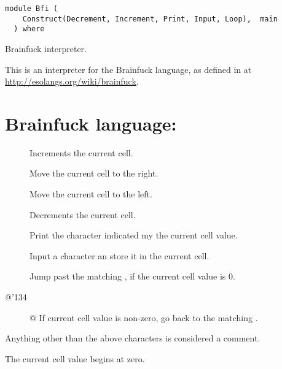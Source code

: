 \label{module:Bfi}
\haddockbeginheader
{\haddockverb\begin{verbatim}
module Bfi (
    Construct(Decrement, Increment, Print, Input, Loop),  main
  ) where\end{verbatim}}
\haddockendheader

Brainfuck interpreter.\par
This is an interpreter for the Brainfuck language, as defined in at
\url{http://esolangs.org/wiki/brainfuck}.\par
\section*{Brainfuck language:}\begin{description}
                              \item[\haddocktt{+}] Increments the current cell.
                              \end{description}\begin{description}
                                               \item[\haddocktt{>}] Move the current cell to the right.
                                               \item[\haddocktt{<}] Move the current cell to the left.
                                               \item[\haddocktt{-}] Decrements the current cell.
                                               \item[] Print the character indicated my the current cell value.
                                               \item[\haddocktt{,}] Input a character an store it in the current cell.
                                               \item[] Jump past the matching {}, if the current cell value is 0.
                                               \item[@{\char '134}] @{} If current cell value is non-zero, go back to the matching {}.
                                               \end{description}Anything other than the above characters is considered a comment.\par
                                                                The current cell value begins at zero.\par

